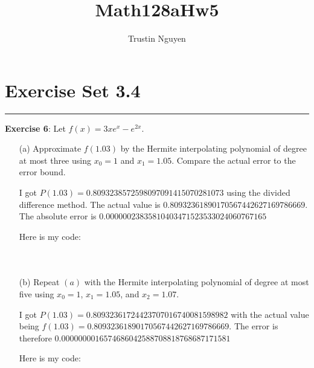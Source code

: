 \documentclass{article}
\title{Math128aHw5}
\author{Trustin Nguyen}
\begin{document}
    \maketitle

\reversemarginpar


\section*{Exercise Set 3.4}
\hrule

\textbf{Exercise 6}: Let $f(x) = 3xe^{x} - e^{2x}$.
    \begin{itemize}
        \item [(a)] Approximate $f(1.03)$ by the Hermite interpolating polynomial of degree at most three using $x_{0} = 1$ and $x_{1} = 1.05$. Compare the actual error to the error bound.
            \begin{answer}
                I got $P(1.03) = 0.8093238572598097091415070281073$ using the divided difference method. The actual value is $0.80932361890170567442627169786669$. The absolute error is $0.00000023835810403471523533024060767165$

                Here is my code:
                \inputminted{matlab}{./code/Hermite/Hermite.m}
                \inputminted{matlab}{./code/Hermite/forwardPoly.m}
                \inputminted{matlab}{./code/script1.m}
            \end{answer}

        \item [(b)] Repeat $(a)$ with the Hermite interpolating polynomial of degree at most five using $x_{0} = 1$, $x_{1} = 1.05$, and $x_{2} = 1.07$.
            \begin{answer}
                I got $P(1.03) = 0.80932361724423707016740081598982$ with the actual value being $f(1.03) = 0.80932361890170567442627169786669$. The error is therefore $0.0000000016574686042588708818768687171581$

                Here is my code:
                \inputminted{matlab}{./code/Hermite/Hermite.m}
                \inputminted{matlab}{./code/Hermite/forwardPoly.m}
                \inputminted{matlab}{./code/script2.m}
            \end{answer}
    \end{itemize}
\end{document}
